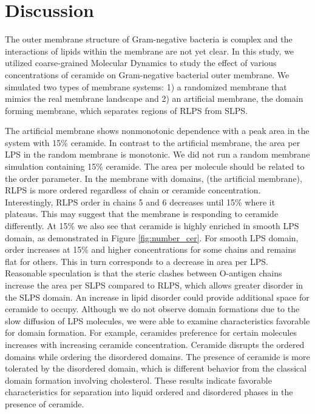 \documentclass[10pt, letterpaper]{article}
\begin{document}
\newpage

\section{Discussion}

The outer membrane structure of Gram-negative bacteria is complex and the interactions of lipids within the membrane are not yet clear. In this study, we utilized coarse-grained Molecular Dynamics to study the effect of various concentrations of ceramide on Gram-negative bacterial outer membrane. We simulated two types of membrane systems: 1) a randomized membrane that mimics the real membrane landscape and 2) an artificial membrane, the domain forming membrane, which separates regions of RLPS from SLPS. 

The artificial membrane shows nonmonotonic dependence with a peak area in the system with 15\% ceramide. In contrast to the artificial membrane, the area per LPS in the random membrane is monotonic. We did not run a random membrane simulation containing 15\% ceramide. The area per molecule should be related to the order parameter. In the membrane with domains, (the artificial membrane), RLPS is more ordered regardless of chain or ceramide concentration. Interestingly, RLPS order in chains 5 and 6 decreases until 15\% where it plateaus. This may suggest that the membrane is responding to ceramide differently. At 15\% we also see that ceramide is highly enriched in smooth LPS domain, as demonstrated in Figure \ref{fig:number_cer}. For smooth LPS domain, order increases at 15\% and higher concentrations for some chains and remains flat for others. This in turn corresponds to a decrease in area per LPS. Reasonable speculation is that the steric clashes between O-antigen chains increase the area per SLPS compared to RLPS, which allows greater disorder in the SLPS domain. An increase in lipid disorder could provide additional space for ceramide to occupy. Although we do not observe domain formations due to the slow diffusion of LPS molecules, we were able to examine characteristics favorable for domain formation. For example, ceramides preference for certain molecules increases with increasing ceramide concentration. Ceramide disrupts the ordered domains while ordering the disordered domains. The presence of ceramide is more tolerated by the disordered domain, which is different behavior from the classical domain formation involving cholesterol. These results indicate favorable characteristics for separation into liquid ordered and disordered phases in the presence of ceramide. 
\end{document}

